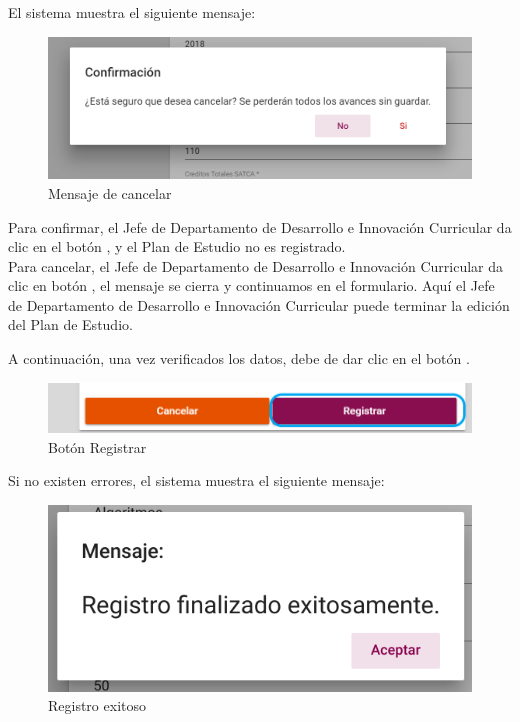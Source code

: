 El sistema muestra el siguiente mensaje:
\begin{figure}[H]
	\centering
	\hypertarget{ms1}{\includegraphics[width=0.7\linewidth]{images/SP4-GPE/m1}}
	\caption{Mensaje de cancelar}
	\label{ms1}
\end{figure}

Para confirmar,  el Jefe de Departamento de Desarrollo e Innovación Curricular da clic en el botón  , y el Plan de Estudio no es registrado.\\

Para cancelar, el Jefe de Departamento de Desarrollo e Innovación Curricular da clic en botón  , el mensaje se cierra y continuamos en el formulario. Aquí el Jefe de Departamento de Desarrollo e Innovación Curricular puede terminar la edición del Plan de Estudio.

A continuación, una vez verificados los datos, debe de dar clic en el botón .
\begin{figure}[H]
	\centering
	\hypertarget{btnreg}{\includegraphics[width=0.7\linewidth]{images/SP4-GPE/registrarB}}
	\caption{Botón Registrar}
	\label{btnreg}
\end{figure}

Si no existen errores, el sistema muestra el siguiente mensaje:
	\begin{figure}[H]
	\centering
	\hypertarget{exito}{\includegraphics[width=0.7\linewidth]{images/SP4-GPE/exito}}
	\caption{Registro exitoso}
	\label{exito}
\end{figure}

